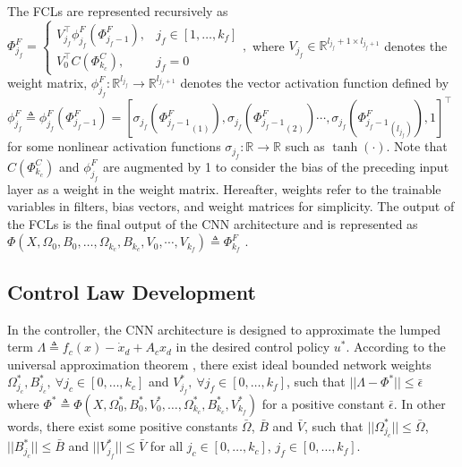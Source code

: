 \documentclass{l4dc2025}
\begin{document}
The FCLs are represented recursively as 
$
    \Phi^F_{j_f} =
        \begin{cases}
            V^\top  _{j_f}\phi^F_{j_f}(\Phi^F_{j_f-1}),  & j_f\in[1,\dots,k_f]   \\
            V_0^\top   C(\Phi^C_{k_c}),                  & j_f=0
        \end{cases},
$
where $V_{j_f}\in\mathbb{R}^{l_{j_f}+1\times l_{j_f+1}}$ denotes the weight matrix, $\phi^F_{j_f}:\mathbb{R}^{l_{j_f}}\to\mathbb{R}^{l_{j_f+1}}$ denotes the vector activation function defined by
$\phi^F_{j_f} \triangleq \phi^F_{j_f}(\Phi^F_{j_f-1})=[\sigma_{j_f}({\Phi^F_{j_f-1}}_{(1)}),\sigma_{j_f}({\Phi^F_{j_f-1}}_{(2)})\cdots,\sigma_{j_f}({\Phi^F_{j_f-1}}_{(l_{j_f})}),1]^\top$ for some nonlinear activation functions $\sigma_{j_f}:\mathbb{R}\to\mathbb{R}$ such as $\tanh(\cdot)$. Note that $C(\Phi^C_{k_c})$ and $\phi^F_{j_f}$ are augmented by 1 to consider the bias of the preceding input layer as a weight in the weight matrix. Hereafter, weights refer to the trainable variables in filters, bias vectors, and weight matrices for simplicity.
The output of the FCLs is the final output of the CNN architecture and is represented as
$
    \Phi(X,\Omega_0,B_0,\dots,\Omega_{k_c},B_{k_c},V_0,\cdots,V_{k_f}) \triangleq \Phi^F_{k_f}
$
.

\subsection{Control Law Development} \label{Coltrol Law Development}

In the controller, the CNN architecture is designed to approximate the lumped term 
$\Lambda\triangleq f_c(x)-\dot x_d+A_cx_d$ in the desired control policy $u^*$.
According to the universal approximation theorem \cite{UnivCNN}, there exist ideal bounded network weights
$\Omega^*_{j_c},B^*_{j_c},\ \forall j_{c}\in [0,\dots,k_c]$ and $V^*_{j_f},\ \forall j_f\in [0,\dots,k_f]$, 
such that $||\Lambda- \Phi^*|| \le \bar \epsilon$
where $\Phi^*\triangleq \Phi(X,\Omega_0^*,B_0^*,V_0^*,\dots,\Omega_{k_c}^*,B_{k_c}^*,V_{k_f}^*)$ for a positive constant $\bar\epsilon$. In other words, there exist some positive constants $\bar\Omega$, $\bar B$ and $\bar V$, such that $||\Omega^*_{j_c}||\le \bar\Omega$, $|| B^*_{j_c}||\le \bar B$ and $|| V^*_{j_f}||\le \bar V$ for all $j_c\in[0,\dots,k_c]$, $j_f\in[0,\dots,k_f]$.
\end{document}
